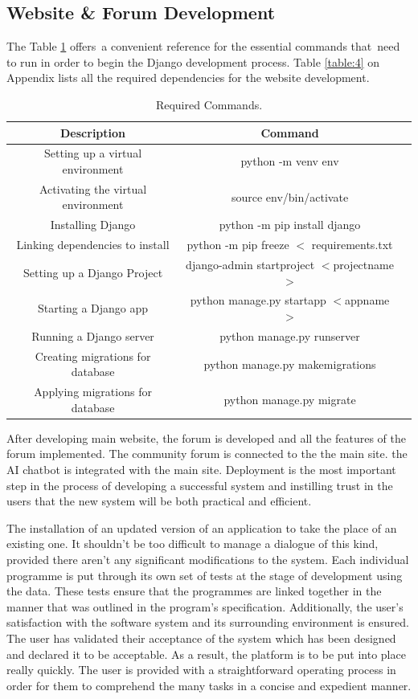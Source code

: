 \subsection{Website \& Forum Development}
The Table \ref{table:3} offers a convenient reference for the essential commands that need to run in order to begin the Django development process. Table \ref{table:4} on Appendix lists all the required dependencies for the website development.
\begin{table}[!h]
	\centering
	\begin{tabular}{ |c|c|c| } 
		\hline
		Description & Command \\
		\hline
		Setting up a virtual environment & python -m venv env \\
		\hline
		Activating the virtual environment & source env/bin/activate \\ 
		\hline
		Installing Django & python -m pip install django \\ 
		\hline
		Linking dependencies to install & python -m pip freeze $<$ requirements.txt \\
		\hline
		Setting up a Django Project & django-admin startproject $<$projectname$>$ \\
		\hline
		Starting a Django app & python manage.py startapp $<$appname$>$ \\
		\hline
		Running a Django server & python manage.py runserver \\
		\hline
		Creating migrations for database & python manage.py makemigrations \\
		\hline
		Applying migrations for database & python manage.py migrate \\
		\hline
	\end{tabular}
	\caption{Required Commands.}
	\label{table:3}
\end{table}

After developing main website, the forum is developed and all the features of the forum implemented. The community forum is connected to the the main site. the AI chatbot is integrated with the main site. Deployment is the most important step in the process of developing a successful system and instilling trust in the users that the new system will be both practical and efficient.

The installation of an updated version of an application to take the place of an existing one. It shouldn't be too difficult to manage a dialogue of this kind, provided there aren't any significant modifications to the system. Each individual programme is put through its own set of tests at the stage of development using the data. These tests ensure that the programmes are linked together in the manner that was outlined in the program's specification. Additionally, the user's satisfaction with the software system and its surrounding environment is ensured. The user has validated their acceptance of the system which has been designed and declared it to be acceptable. As a result, the platform is to be put into place really quickly. The user is provided with a straightforward operating process in order for them to comprehend the many tasks in a concise and expedient manner.

